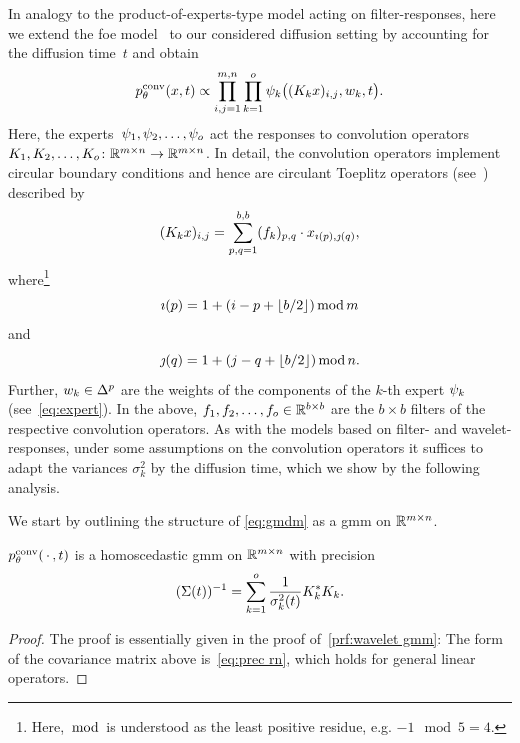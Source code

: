 In analogy to the product-of-experts-type model acting on filter-responses, here we extend the \gls{foe} model~\cite{RoBl09} to our considered diffusion setting by accounting for the diffusion time~\( t \) and obtain
\begin{equation}
	\OvercompleteModel(x, t) \propto \prod_{i,j=\num{1}}^{\Height,\Width} \prod_{k=\num{1}}^\NumExperts \Expert_k \bigl((K_k x)_{i, j}, w_{k}, t\bigr).
	\label{eq:gmdm}
\end{equation}
Here, the experts~\( \Expert_{\num{1}}, \Expert_{\num{2}}, \dotsc, \Expert_\NumExperts \) act the responses to convolution operators \( \map{K_{\num{1}}, K_{\num{2}}, \dotsc,\allowbreak K_\NumExperts}{\R^{\Height\times\Width}}{\R^{\Height\times\Width}} \).
In detail, the convolution operators implement circular boundary conditions and hence are circulant Toeplitz operators (see~\cite[section 5.5.2]{Nikolski2020-dx}) described by
\begin{equation}
	(K_k x)_{i, j} = \sum_{p, q=\num{1}}^{b, b} (\Filter_k)_{p, q} \cdot x_{\imath(p), \jmath(q)},
\end{equation}
where\footnote{%
	Here, \( \mod \) is understood as the least positive residue, e.g. \( \num{-1} \mod \num{5} = \num{4} \).
}
\begin{equation}
	 \imath(p) = \num{1} + (i - p + \lfloor b / \num{2} \rfloor) \mod \Height 
\end{equation}
and
\begin{equation}
	\jmath(q) = \num{1} + (j - q + \lfloor b / \num{2} \rfloor) \mod \Width.
\end{equation}
Further, \( w_k \in \Simplex^\NumComponents \) are the weights of the components of the \( k \)-th expert \( \Expert_k \) (see~\eqref{eq:expert}).
In the above, \( \Filter_{\num{1}}, \Filter_{\num{2}}, \dotsc, \Filter_\NumExperts \in \R^{b \times b} \) are the \( b \times b \) filters of the respective convolution operators.
As with the models based on filter- and wavelet-responses, under some assumptions on the convolution operators it suffices to adapt the variances \( \sigma_k^{\num{2}} \) by the diffusion time, which we show by the following analysis.

We start by outlining the structure of \eqref{eq:gmdm} as a \gls{gmm} on \( \R^{\Height \times \Width} \).
\begin{theorem}
	\( \OvercompleteModel(\argm, t) \) is a homoscedastic \gls{gmm} on \( \R^{\Height \times \Width} \) with precision
	\begin{equation}
		(\Sigma(t))^{-1} = \sum_{k=\num{1}}^\NumExperts \frac{1}{\sigma_k^{\num{2}}(t)} \Adjoint{K_k}K_k.
		\label{eq:prec overcomplete}
	\end{equation}%
	\label{th:overcomplete gmm}
\end{theorem}
\begin{proof}
	The proof is essentially given in the proof of~\cref{prf:wavelet gmm}:
	The form of the covariance matrix above is~\cref{eq:prec rn}, which holds for general linear operators.
\end{proof}

